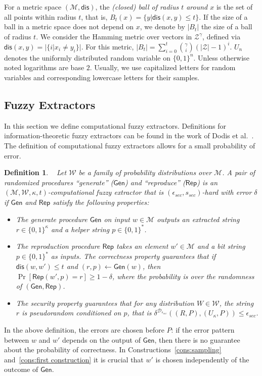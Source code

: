 \documentclass[11pt]{article}
\newtheorem{definition}[theorem]{Definition}
\newcommand{\class}[1]{{\ensuremath{\mathsf{#1}}}}
\newcommand{\gen}{\ensuremath{\class{Gen}}\xspace}
\newcommand{\rep}{\ensuremath{\class{Rep}}\xspace}
\newcommand{\dis}{\ensuremath{\mathsf{dis}}}
\begin{document}
For a metric space $(\mathcal{M}, \dis)$, the \emph{(closed) ball of radius $t$ around $x$} is the set of all points within radius $t$, that is, $B_t(x) = \{y| \dis(x, y)\leq t\}$.  If the size of a ball in a metric space does not depend on $x$, we denote by $|B_t|$ the size of a ball of radius $t$.  We consider the Hamming metric over vectors in $\mathcal{Z}^\gamma$, defined via $\dis(x,y) = |\{i | x_i \neq y_i\}|$.  For this metric, $|B_t| = \sum_{i=0}^t {\gamma \choose i} (|\mathcal{Z}|-1)^i $.  $U_n$ denotes the uniformly  distributed random variable on $\{0,1\}^n$.  Unless otherwise noted logarithms are base $2$.
Usually, we use capitalized letters for random variables and corresponding lowercase letters for their samples.

\subsection{Fuzzy Extractors}
\label{sec:fuzzy extractors}

In this section we define computational fuzzy extractors.  Definitions for information-theoretic fuzzy extractors can be found in the work of Dodis et al.~\cite[Sections 2.5--4.1]{DBLP:journals/siamcomp/DodisORS08}.  The definition of computational fuzzy extractors allows for a small probability of error.  %

\begin{definition}~\cite[Definition 2.5]{fuller2013computational}
\label{def:comp fuzzy extractor}
Let $\mathcal{W}$ be a family of probability distributions over $\mathcal{M}$. A pair of randomized procedures ``generate'' ($\gen$) and ``reproduce'' ($\rep$) is an $(\mathcal{M}, \mathcal{W}, \kappa, t)$-\emph{computational fuzzy extractor} that is $(\epsilon_{sec}, s_{sec})$-hard with error $\delta$ if \gen and \rep satisfy the following properties:
\begin{itemize}
\item The generate procedure \gen on input $w\in \mathcal{M}$ outputs an extracted string $r\in\{0,1\}^\kappa$ and a helper string $p\in\{0,1\}^*$.
\item The reproduction procedure \rep takes an element $w'\in\mathcal{M}$ and a bit string $p\in\{0,1\}^*$ as inputs.  The \emph{correctness} property guarantees that if $\dis(w, w')\leq t$ and $(r, p)\leftarrow \gen(w)$, then $\Pr[\rep( w', p) = r] \geq 1-\delta$, where the probability is over the randomness of $(\gen, \rep)$.
\item The \emph{security} property guarantees that for any distribution $W\in \mathcal{W}$, the string $r$ is pseudorandom conditioned on $p$, that is $\delta^{\mathcal{D}_{s_{sec}}}((R, P), (U_\kappa, P))\leq \epsilon_{sec}$.
\end{itemize}
\end{definition}
In the above definition, the errors are chosen before $P$: if the error pattern between $w$ and $w'$ depends on the output of $\gen$, then there is no guarantee about the probability of correctness. In Constructions~\ref{cons:sampling} and~\ref{cons:first construction} it is crucial that $w'$ is chosen independently of the outcome of \gen.
\end{document}
